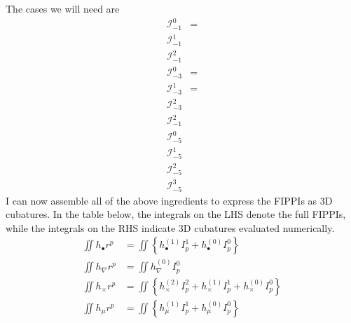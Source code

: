 \documentclass[dvips,letterpaper]{article}
\begin{document}
The cases we will need are 
\begin{align*}
\mathcal{I}^0_{-1}
 &=
\\
\mathcal{I}^1_{-1}
\\
\mathcal{I}^2_{-1}
\\
\mathcal{I}^0_{-3}
 &=
\\
\mathcal{I}^1_{-3}
 &=
\\
\mathcal{I}^2_{-3}
\\
\mathcal{I}^2_{-1}
\\
\mathcal{I}^0_{-5}
\\
\mathcal{I}^1_{-5}
\\
\mathcal{I}^2_{-5}
\\
\mathcal{I}^3_{-5}
\end{align*}
I can now assemble all of the above ingredients to express the
FIPPIs as 3D cubatures. In the table below, the integrals on the 
LHS denote the full FIPPIs, while the integrals on the RHS indicate
3D cubatures evaluated numerically.
\begin{align*}
 \iint h_\bullet r^p
&=\iint \left\{   h_{\bullet}^{(1)} I^1_{p} 
                + h_{\bullet}^{(0)} I^0_{p} 
        \right\}
\\
 \iint h_\nabla r^p 
&=\iint h_\nabla^{(0)} I^0_p 
\\
 \iint h_\times r^p
&=\iint \left\{  h_\times^{(2)} I^2_p
                +h_\times^{(1)} I^1_p
                +h_\times^{(0)} I^0_p
         \right\}
\\
  \iint h_\mu r^p
&=\iint \left\{  h_{\mu}^{(1)} I^1_p 
                +h_{\mu}^{(0)} I^0_p 
         \right\}
\end{align*}
 
\appendix

 
 
\end{document}
